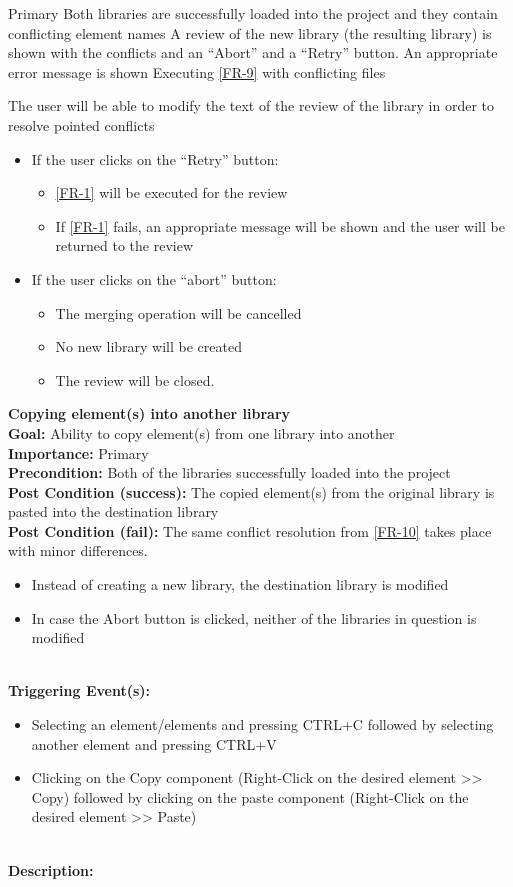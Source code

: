 \documentclass[10pt,a4paper]{report}
\newcommand{\precondition}[1]{
    \textbf{Precondition: } #1 \leavevmode \\
}
\newcommand{\FRDescription}[8]{
    \textbf{#1} \leavevmode \\
    \textbf{Goal: } #2 \leavevmode \\
    \textbf{Importance: } #3 \leavevmode \\
    \precondition{#4}
    \textbf{Post Condition (success): } #5 \leavevmode \\
    \textbf{Post Condition (fail): } #6 \leavevmode \\
    \textbf{Triggering Event(s): } #7 \leavevmode \\
    \textbf{Description: } \leavevmode \\ 
    #8}
\begin{document}
\begin{FR}
    {Primary}
    {Both libraries are successfully loaded into the project and they contain conflicting element names}
    {A review of the new library (the resulting library) is shown with the conflicts and an “Abort” and a “Retry” button.}
    {An appropriate error message is shown}
    {Executing \ref{FR-9} with conflicting files}
    {The user will be able to modify the text of the review of the library in order to resolve pointed conflicts
    \begin{itemize}
        \item If the user clicks on the “Retry” button:
        \begin{itemize}
            \item \ref{FR-1} will be executed for the review
            \item If \ref{FR-1} fails, an appropriate message will be shown and the user will be returned to the review
        \end{itemize}
        \item If the user clicks on the “abort” button:
        \begin{itemize}
            \item The merging operation will be cancelled
            \item No new library will be created
            \item The review will be closed.
        \end{itemize}
    \end{itemize}}
    \item \FRDescription{Copying element(s) into another library}
    {Ability to copy element(s) from one library into another}
    {Primary} 
    {Both of the libraries successfully loaded into the project}
    {The copied element(s) from the original library is pasted into the destination library}
    {The same conflict resolution from \ref{FR-10} takes place with minor differences.
    \begin{itemize}
        \item Instead of creating a new library, the destination library is modified
        \item In case the Abort button is clicked, neither of the libraries in question is modified
    \end{itemize}}
    {\begin{itemize}
        \item Selecting an element/elements and pressing CTRL+C followed by selecting another element and pressing CTRL+V
        \item Clicking on the Copy component (Right-Click on the desired element >> Copy) followed by clicking on the paste component (Right-Click on the desired element >> Paste)

\end{itemize}}
\end{FR}
\end{document}
